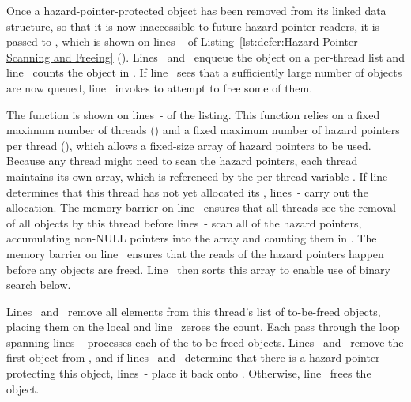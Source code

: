 \begin{lineref}
Once a hazard-pointer-protected object has been removed from its
linked data structure, so that it is now inaccessible to future
hazard-pointer readers, it is passed to ,
which is shown on lines~- of
Listing~\ref{lst:defer:Hazard-Pointer Scanning and Freeing}
().
Lines~ and~
enqueue the object on a per-thread list 
and line~ counts the object in .
If line~ sees that a sufficiently large number of objects are now
queued, line~ invokes  to attempt to
free some of them.
\end{lineref}

\begin{lineref}
The  function is shown on lines~-
of the listing.
This function relies on a fixed maximum number of threads ()
and a fixed maximum number of hazard pointers per thread (),
which allows a fixed-size array of hazard pointers to be used.
Because any thread might need to scan the hazard pointers, each thread
maintains its own array, which is referenced by the per-thread variable
.
If line~ determines that this thread has not yet allocated its
, lines~- carry out the allocation.
The memory barrier on line~ ensures that all threads see the
removal of all objects by this thread before
lines~- scan
all of the hazard pointers, accumulating non-NULL pointers into
the  array and counting them in .
The memory barrier on line~ ensures that the reads of
the hazard pointers
happen before any objects are freed.
Line~ then sorts this array to enable use of binary search below.

Lines~ and~
remove all elements from this thread's list of
to-be-freed objects, placing them on the local 
and line~ zeroes the count.
Each pass through the loop spanning
lines~- processes each
of the to-be-freed objects.
Lines~ and~
remove the first object from ,
and if lines~ and~
determine that there is a hazard pointer
protecting this object, lines~-
place it back onto .
Otherwise, line~ frees the object.
\end{lineref}

